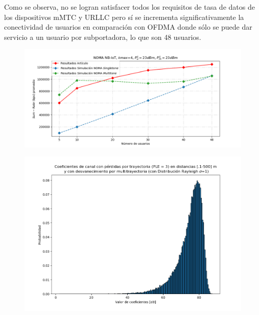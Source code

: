 Como se observa, no se logran satisfacer todos los requisitos de tasa de datos de los dispositivos mMTC y URLLC pero sí se incrementa significativamente la conectividad de usuarios en comparación con OFDMA donde sólo se puede dar servicio a un usuario por subportadora, lo que son 48 usuarios.\newline


\begin{figure}[th]
    \centering
    \includegraphics[scale=.7]{Figures/NOMA_sumrate.png}
    \decoRule
    \caption[]{}
    \label{fig:ResultsNOMA}
\end{figure}

\begin{figure}[th]
    \centering
    \includegraphics[scale=.7]{Figures/CoeficientesCanalShahini}
    \decoRule
    \caption[]{}
    \label{fig:CoeficientesCanalShahini}
\end{figure}





\hfill

\break

